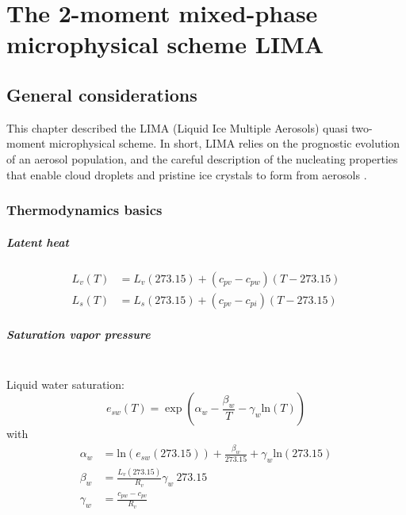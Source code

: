 \chapter{The 2-moment mixed-phase microphysical scheme LIMA}
\minitoc


\section{General considerations}
This chapter described the LIMA (Liquid Ice Multiple Aerosols) quasi two-moment microphysical scheme.
In short, LIMA relies on the prognostic evolution of an aerosol population, and the careful description of the nucleating properties that enable cloud droplets and pristine ice crystals to form from aerosols \citep{Vie2016}. 

\subsection{Thermodynamics basics}

\paragraph{Latent heat}
\begin{align}
 \label{latent-heat-vaporization}
 L_v(T) &= L_v(273.15) + (c_{pv} - c_{pw}) (T-273.15) \\
 \label{latent-heat-sublimation}
 L_s(T) &= L_s(273.15) + (c_{pv} - c_{pi}) (T-273.15)
\end{align}

\paragraph{Saturation vapor pressure}
~\\
Liquid water saturation:
\begin{equation}
 \label{saturation-pressure-water}
 e_{sw}(T) = \exp(\alpha_w - \frac{\beta_w}{T} - \gamma_w\mathrm{ln}(T))
\end{equation}
with
\begin{align}
 \alpha_w &= \mathrm{ln}(e_{sw}(273.15)) + \frac{\beta_w}{273.15} + \gamma_w\mathrm{ln}(273.15) \\
 \beta_w &= \frac{L_v(273.15)}{R_v} \gamma_w ~ 273.15 \\
 \gamma_w &= \frac{c_{pw} - c_{pv}}{R_v}
\end{align}

